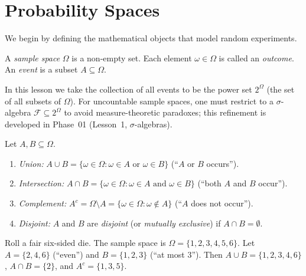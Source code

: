 \documentclass[11pt,a4paper]{article}
\begin{document}

\section{Probability Spaces}
\label{sec:prob_spaces}

We begin by defining the mathematical objects that model random experiments.

\begin{definition}
\label{def:sample_space}
A \emph{sample space} $\Omega$ is a non-empty set. Each element
$\omega \in \Omega$ is called an \emph{outcome}. An \emph{event} is a
subset $A \subseteq \Omega$.
\end{definition}

\begin{remark}
\label{rem:power_set}
In this lesson we take the collection of all events to be the power set
$2^\Omega$ (the set of all subsets of $\Omega$). For uncountable sample
spaces, one must restrict to a $\sigma$-algebra
$\mathcal{F} \subseteq 2^\Omega$ to avoid measure-theoretic paradoxes;
this refinement is developed in Phase~01 (Lesson~1, $\sigma$-algebras).
\end{remark}

\begin{definition}
\label{def:set_ops}
Let $A, B \subseteq \Omega$.
\begin{enumerate}[nosep]
    \item \emph{Union:}
    $A \cup B = \{\omega \in \Omega : \omega \in A \text{ or }
    \omega \in B\}$ (``$A$ or $B$ occurs'').
    \item \emph{Intersection:}
    $A \cap B = \{\omega \in \Omega : \omega \in A \text{ and }
    \omega \in B\}$ (``both $A$ and $B$ occur'').
    \item \emph{Complement:}
    $A^c = \Omega \setminus A = \{\omega \in \Omega : \omega \notin A\}$
    (``$A$ does not occur'').
    \item \emph{Disjoint:} $A$ and $B$ are \emph{disjoint} (or
    \emph{mutually exclusive}) if $A \cap B = \emptyset$.
\end{enumerate}
\end{definition}

\begin{example}
\label{ex:die_roll}
Roll a fair six-sided die. The sample space is
$\Omega = \{1, 2, 3, 4, 5, 6\}$. Let $A = \{2, 4, 6\}$ (``even'') and
$B = \{1, 2, 3\}$ (``at most 3''). Then $A \cup B = \{1, 2, 3, 4, 6\}$,
$A \cap B = \{2\}$, and $A^c = \{1, 3, 5\}$.
\end{example}
\end{document}
